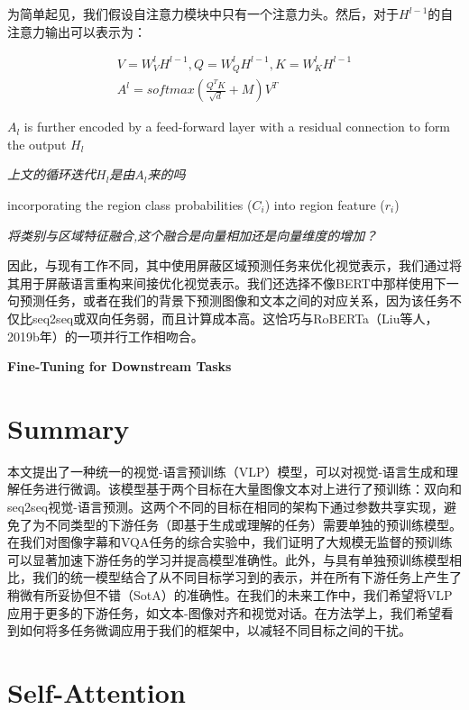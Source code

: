\documentclass{article}
\begin{document}
\begin{sloppypar}
      为简单起见，我们假设自注意力模块中只有一个注意力头。然后，对于$H^{l-1}$的自注意力输出可以表示为：

      \begin{gather}
            V=W^l_VH^{l-1},Q=W^l_QH^{l-1},K=W^l_KH^{l-1}\\
            A^l=softmax(\frac{Q^TK}{\sqrt d}+M)V^T
      \end{gather}

      $A_l$ is further encoded by a feed-forward layer with a residual connection to form the output $H_l$


      \textit{上文的循环迭代$H_l$是由$A_l$来的吗}

      incorporating the region class probabilities ($C_i$) into region feature ($r_i$)

      \textit{将类别与区域特征融合,这个融合是向量相加还是向量维度的增加？}

      因此，与现有工作不同，其中使用屏蔽区域预测任务来优化视觉表示，我们通过将其用于屏蔽语言重构来间接优化视觉表示。我们还选择不像BERT中那样使用下一句预测任务，或者在我们的背景下预测图像和文本之间的对应关系，因为该任务不仅比seq2seq或双向任务弱，而且计算成本高。这恰巧与RoBERTa（Liu等人，2019b年）的一项并行工作相吻合。


      \centerline{\textbf{Fine-Tuning for Downstream Tasks}}



      \section{Summary}

      本文提出了一种统一的视觉-语言预训练（VLP）模型，可以对视觉-语言生成和理解任务进行微调。该模型基于两个目标在大量图像文本对上进行了预训练：双向和seq2seq视觉-语言预测。这两个不同的目标在相同的架构下通过参数共享实现，避免了为不同类型的下游任务（即基于生成或理解的任务）需要单独的预训练模型。在我们对图像字幕和VQA任务的综合实验中，我们证明了大规模无监督的预训练可以显著加速下游任务的学习并提高模型准确性。此外，与具有单独预训练模型相比，我们的统一模型结合了从不同目标学习到的表示，并在所有下游任务上产生了稍微有所妥协但不错（SotA）的准确性。在我们的未来工作中，我们希望将VLP应用于更多的下游任务，如文本-图像对齐和视觉对话。在方法学上，我们希望看到如何将多任务微调应用于我们的框架中，以减轻不同目标之间的干扰。

      \section{Self-Attention}


\end{sloppypar}
\end{document}
